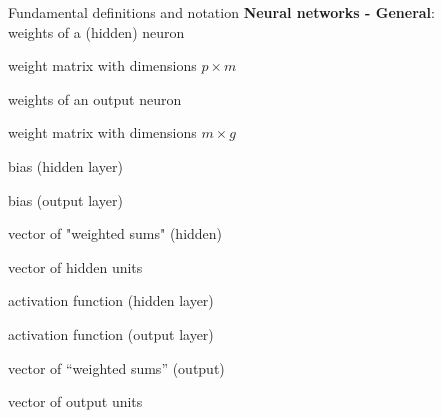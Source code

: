 \begin{frame}   {Fundamental definitions and notation}
    \textbf{Neural networks - General}:\\
    \vspace{3mm}
    \makebox[4cm]{$\wtw$}  \hspace{1cm}weights of a (hidden) neuron\par
    \makebox[4cm]{$\Wmat$}   \hspace{1cm}weight matrix with dimensions $p \times m$\par
    \makebox[4cm]{$\wtu$}  \hspace{1cm}weights of an output neuron\par
       \hspace{1cm}weight matrix with dimensions $m \times g$\par
      \hspace{1cm}bias (hidden layer) \par
      \hspace{1cm}bias (output layer) \par
    \vspace{3mm}
      \hspace{1cm}vector of "weighted sums" (hidden)\par
      \hspace{1cm}vector of hidden units\par
    \vspace{3mm}
    \makebox[4cm]{$\sigma$}  \hspace{1cm}activation function (hidden layer)\par
    \makebox[4cm]{$\tau$}  \hspace{1cm}activation function (output layer)\par
    \vspace{3mm}
      \hspace{1cm}vector of \enquote{weighted sums} (output)\par
      \hspace{1cm}vector of output units\par
    \vspace{3mm}
    


\end{frame}

